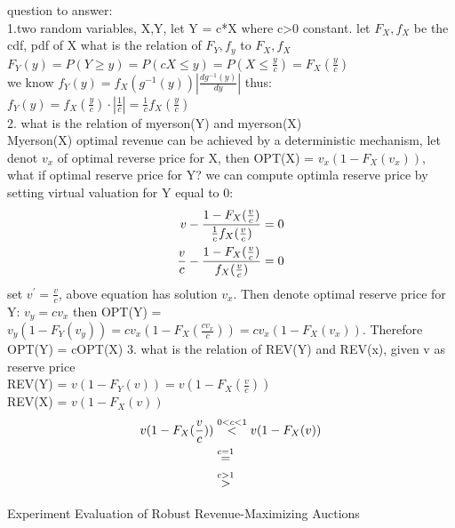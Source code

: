 question to answer:\\
1.two random variables, X,Y, let Y = c*X where c>0 constant. let $F_X,f_X$ be the cdf, pdf of X what is the relation of $F_Y,f_y$ to $F_X,f_X$\\
$F_Y (y) = P(Y \geqslant y) = P(cX \leqslant y) = P(X \leqslant \frac{y}{c}) = F_X (\frac{y}{c})$\\
we know $f_Y(y) = f_X (g^{-1}(y))|\frac{d g^{-1}(y)}{dy}|$ thus:\\
$f_Y (y) = f_X(\frac{y}{c})\cdot|\frac{1}{c}| =\frac{1}{c}f_X(\frac{y}{c})$\\
2. what is the relation of myerson(Y) and myerson(X)\\
Myerson(X) optimal revenue can be achieved by a deterministic mechanism, let denot $v_x$ of optimal reverse price for X, then OPT(X) = $v_x(1-F_X(v_x))$, what if optimal reserve price for Y?
we can compute optimla reserve price by setting virtual valuation for Y equal to 0:
\begin{align}\notag
v - \frac{1-F_X (\frac{v}{c})}{\frac{1}{c}f_X(\frac{v}{c}) } &= 0 \\     
\notag  \frac{v}{c} - \frac{1-F_X (\frac{v}{c})}{ f_X(\frac{v}{c}) }  &= 0
\end{align}
set $v^{'} = \frac{v}{c}$, above equation has solution $v_x$.
Then denote optimal reserve price for Y: $v_y =c v_x$ then OPT(Y) = $v_y(1 - F_Y(v_y)) =cv_x(1 - F_X(\frac{cv_x}{c})) = cv_x(1 - F_X(v_x))$. Therefore OPT(Y) = cOPT(X)
3. what is the relation of REV(Y) and REV(x), given v as reserve price\\
REV(Y) = $v(1-F_Y(v)) = v(1-F_X(\frac{v}{c}))$\\
REV(X) =  $v(1-F_X(v))$ 
\begin{equation}\notag
\begin{split}	
v(1-F_X(\frac{v}{c})) &\overset{0 < c < 1}{ < }v(1-F_X(v))\\&\overset{c= 1}{ = } \\&\overset{c > 1}{ > }
\end{split}
\end{equation} 




Experiment Evaluation of Robust Revenue-Maximizing Auctions\\ \\


